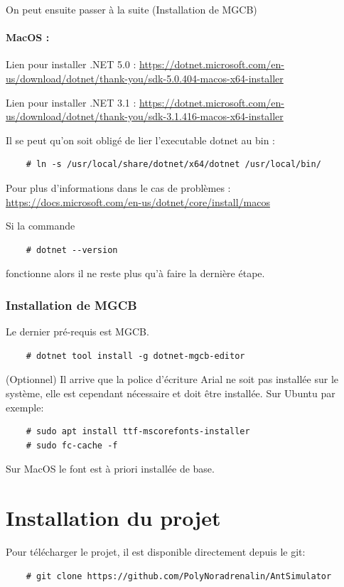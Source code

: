 \documentclass{EPUProjetDi}
\begin{document}
On peut ensuite passer à la suite (Installation de MGCB)

\pagebreak

\paragraph{MacOS :\\}

Lien pour installer .NET 5.0 : \url{https://dotnet.microsoft.com/en-us/download/dotnet/thank-you/sdk-5.0.404-macos-x64-installer}

Lien pour installer .NET 3.1 : \url{https://dotnet.microsoft.com/en-us/download/dotnet/thank-you/sdk-3.1.416-macos-x64-installer}

Il se peut qu'on soit obligé de lier l'executable dotnet au bin : 

\begin{verbatim}
    # ln -s /usr/local/share/dotnet/x64/dotnet /usr/local/bin/
\end{verbatim}

Pour plus d'informations dans le cas de problèmes : \url{https://docs.microsoft.com/en-us/dotnet/core/install/macos}

Si la commande \begin{verbatim}
    # dotnet --version
\end{verbatim} fonctionne alors il ne reste plus qu'à faire la dernière étape. 

\subsubsection*{Installation de MGCB}

Le dernier pré-requis est MGCB.

\begin{verbatim}
    # dotnet tool install -g dotnet-mgcb-editor
\end{verbatim}

(Optionnel) Il arrive que la police d'écriture Arial ne soit pas installée sur le système, elle est cependant nécessaire
et doit être installée. Sur Ubuntu par exemple:
\begin{verbatim}
    # sudo apt install ttf-mscorefonts-installer
    # sudo fc-cache -f
\end{verbatim}

Sur MacOS le font est à priori installée de base.

\section*{Installation du projet}
Pour télécharger le projet, il est disponible directement depuis le git:
\begin{verbatim}
    # git clone https://github.com/PolyNoradrenalin/AntSimulator
\end{verbatim}
\end{document}
